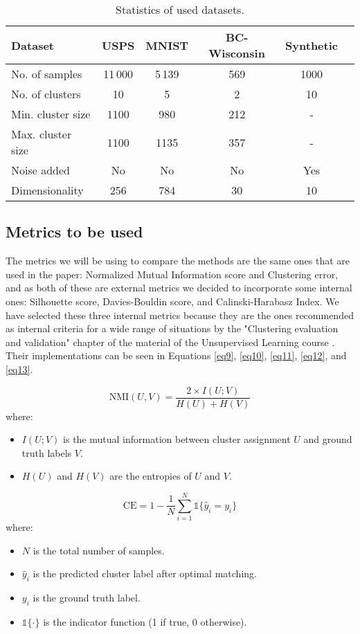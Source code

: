 \documentclass[
	10pt,
	parskip=half-,	
	paper=a4,
	english
	]{scrartcl}
\begin{document}
\begin{table}[h]
\centering
\caption{Statistics of used datasets.}
\begin{tabular}{lccccc}
\toprule
\textbf{Dataset} & \textbf{USPS} & \textbf{MNIST} & \textbf{BC-Wisconsin} & \textbf{Synthetic}\\
\midrule
No. of samples     & 11\,000 & 5\,139 & 569 & 1000 \\
No. of clusters    & 10     & 5     & 2    & 10   \\
Min. cluster size  & 1100   & 980   & 212     & - \\
Max. cluster size  & 1100   & 1135  & 357     & - \\
Noise added  & No   & No  & No     & Yes \\
Dimensionality     & 256    & 784   & 30   & 10 \\
\bottomrule
\end{tabular}
\end{table}

\subsection{Metrics to be used}

The metrics we will be using to compare the methods are the same ones that are used in the paper: Normalized Mutual Information score and Clustering error, and as both of these are external metrics we decided to incorporate some internal ones: Silhouette score, Davies-Bouldin score, and Calinski-Harabasz Index. We have selected these three internal metrics because they are the ones recommended as internal criteria for a wide range of situations by the "Clustering evaluation and validation" chapter of the material of the Unsupervised Learning course \cite{citation2}. Their implementations can be seen in Equations \ref{eq9}, \ref{eq10}, \ref{eq11}, \ref{eq12}, and \ref{eq13}.

\begin{equation}
    \text{NMI}(U, V) = \frac{2 \times I(U; V)}{H(U) + H(V)}
    \label{eq9}
\end{equation}
where:
\begin{itemize}
    \item $I(U; V)$ is the mutual information between cluster assignment $U$ and ground truth labels $V$.
    \item $H(U)$ and $H(V)$ are the entropies of $U$ and $V$.
\end{itemize}

\begin{equation}
    \text{CE} = 1 - \frac{1}{N} \sum_{i=1}^{N} \mathbb{1}\{ \hat{y}_i = y_i \}
    \label{eq10}
\end{equation}
where:
\begin{itemize}
    \item $N$ is the total number of samples.
    \item $\hat{y}_i$ is the predicted cluster label after optimal matching.
    \item $y_i$ is the ground truth label.
    \item $\mathbb{1}\{\cdot\}$ is the indicator function (1 if true, 0 otherwise).
\end{itemize}
\end{document}
